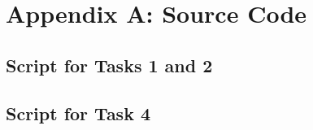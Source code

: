 \section{Appendix A: Source Code}

\subsection{Script for Tasks 1 and 2}

\pagebreak

\subsection{Script for Task 4}

